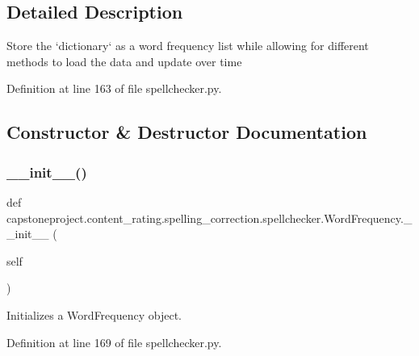 \subsection{Detailed Description}
\begin{DoxyVerb}Store the `dictionary` as a word frequency list while allowing for different methods to load the data and update
over time
\end{DoxyVerb}
 

Definition at line 163 of file spellchecker.\+py.



\subsection{Constructor \& Destructor Documentation}
\mbox{\label{classcapstoneproject_1_1content__rating_1_1spelling__correction_1_1spellchecker_1_1_word_frequency_a62f079fd2ddf25767d1d6ebcf9882ae5}} 
\subsubsection{\texorpdfstring{\+\_\+\+\_\+init\+\_\+\+\_\+()}{\_\_init\_\_()}}
{\footnotesize\ttfamily def capstoneproject.\+content\+\_\+rating.\+spelling\+\_\+correction.\+spellchecker.\+Word\+Frequency.\+\_\+\+\_\+init\+\_\+\+\_\+ (\begin{DoxyParamCaption}\item[{}]{self }\end{DoxyParamCaption})}

\begin{DoxyVerb}Initializes a WordFrequency object.
\end{DoxyVerb}
 

Definition at line 169 of file spellchecker.\+py.



